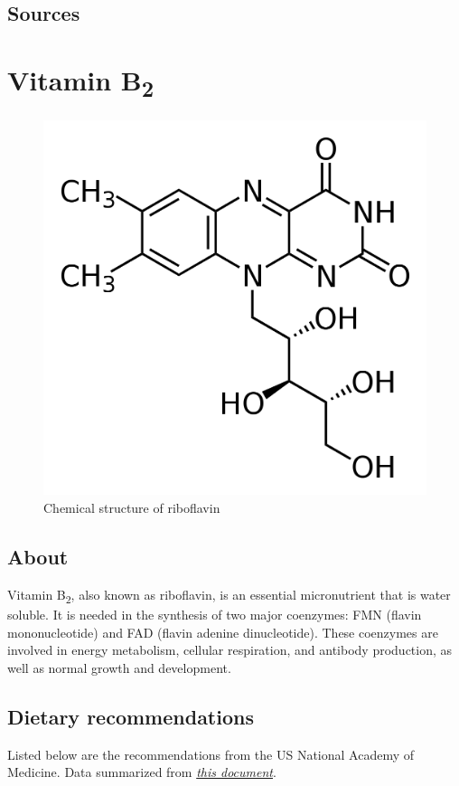 \documentclass{book}
\begin{document}
\section{Sources}


\chapter{Vitamin B\textsubscript{2}}
\begin{figure}[h]
	\caption{Chemical structure of riboflavin}
	\centering \includegraphics[width=\textwidth]{images/Vitamin_B2_chemical_structure}
\end{figure}
\newpage

\section{About}
Vitamin B\textsubscript{2}, also known as riboflavin, is an essential micronutrient that is water soluble. It is needed in the synthesis of two major coenzymes: FMN (flavin mononucleotide) and FAD (flavin adenine dinucleotide). These coenzymes are involved in energy metabolism, cellular respiration, and antibody production, as well as normal growth and development.

\section{Dietary recommendations}
Listed below are the recommendations from the US National Academy of Medicine. Data summarized from \href{https://nap.nationalacademies.org/read/6015/chapter/7}{\textit{this document}}.
\end{document}
